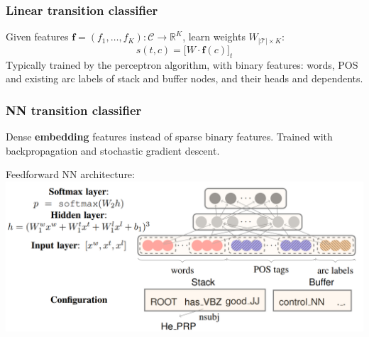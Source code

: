\documentclass[t]{beamer}
\begin{document}
\begin{frame}
    \frametitle{Linear transition classifier \cite{Nivre03anefficient}}
    Given features $\mathbf{f}=(f_1, \ldots, f_K) : \mathcal{C}\to\mathbb{R}^K$, learn weights $W_{|\mathcal{T}|\times K}$:
    \[
    s(t,c)=\big[W\cdot\mathbf{f}(c)\big]_t
    \]
    Typically trained by the perceptron algorithm, with binary features:
	words, POS and existing arc labels of stack and buffer nodes, and
	their heads and dependents.
\end{frame}

\begin{frame}
    \frametitle{NN transition classifier \cite{chen2014fast}}
    Dense \textbf{embedding} features instead of sparse binary features.
    Trained with backpropagation and stochastic gradient descent.
    
    \vfill
    
    Feedforward NN architecture:
    \includegraphics[width=\textwidth,height=\textheight,keepaspectratio]{nn.png}
\end{frame}
\end{document}
